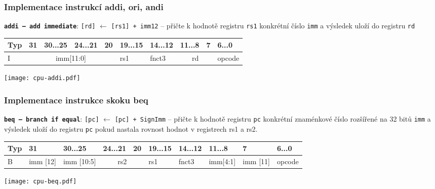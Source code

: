\documentclass{beamer}
\begin{document}
\begin{frame}[shrink=10]
\frametitle{Implementace instrukcí addi, ori, andi}

\textbf{\texttt{addi -- add immediate}}: \texttt{[rd]} $\leftarrow$ \texttt{[rs1] + imm12} -- přičte k hodnotě registru \texttt{rs1} konkrétní číslo \texttt{imm} a výsledek uloží do registru \texttt{rd}

\bigskip

\begin{table}
\footnotesize
\begin{tabular}{|m{0.4cm}|m{0.4cm}|m{1.0cm}|m{1.0cm}|m{0.4cm}|m{1.0cm}|m{1.0cm}|m{1.0cm}|m{0.4cm}|m{1.0cm}|}\hline
Typ & 31 & 30...25 & 24...21 & 20 & 19...15 & 14...12 & 11...8 & 7 & 6...0 \\ \hline
I & \multicolumn{4}{c|}{ imm[11:0] } & rs1 & fnct3 &\multicolumn{2}{c|}{ rd } & opcode\\ \hline
\end{tabular}
\end{table}

\bigskip

\texttt{[image: cpu-addi.pdf]}

\end{frame}


\begin{frame}[shrink=15]
\frametitle{Implementace instrukce skoku beq}

\textbf{\texttt{beq -- branch if equal}}: \texttt{[pc]} $\leftarrow$ \texttt{[pc] + SignImm} -- přičte k hodnotě registru \texttt{pc} konkrétní znaménkové číslo rozšířené na 32 bitů \texttt{imm} a výsledek uloží do registru \texttt{pc} pokud nastala rovnost hodnot v registrech rs1 a rs2.

\bigskip

\begin{table}
\footnotesize
\begin{tabular}{|m{0.4cm}|m{0.4cm}|m{1.0cm}|m{1.0cm}|m{0.4cm}|m{1.0cm}|m{1.0cm}|m{1.0cm}|m{0.4cm}|m{1.0cm}|}\hline
Typ & 31 & 30...25 & 24...21 & 20 & 19...15 & 14...12 & 11...8 & 7 & 6...0 \\ \hline
B & imm [12] & imm [10:5]  & \multicolumn{2}{c|}{ rs2 } & rs1 & fnct3 & imm[4:1]& imm [11] & opcode\\ \hline
\end{tabular}
\end{table}

\bigskip

\texttt{[image: cpu-beq.pdf]}

\end{frame}
\end{document}
